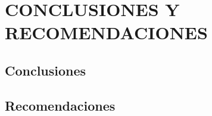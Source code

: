 \chapter{CONCLUSIONES Y RECOMENDACIONES}
\section{Conclusiones}
\lipsum[1-3]

\section{Recomendaciones}
\lipsum[1-3]